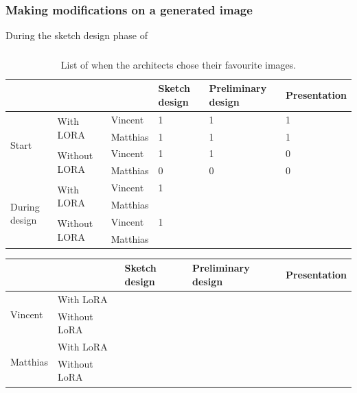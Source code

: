 \subsubsection{Making modifications on a generated image}
During the sketch design phase of 
\subsubsection{}
\begin{table}[h]
\centering
\begin{tabular}{|l|l|l|l|l|l|}

\hline
 & & & Sketch design & Preliminary design & Presentation \\
 \hline

\multirow{4}{*}{Start} & \multirow{2}{*}{With LORA} & Vincent & 1 & 1 & 1 \\ 

\cline{3-6}
& & Matthias & 1 & 1 & 1 \\

\cline{2-6}
& \multirow{2}{*}{Without LORA} & Vincent & 1 & 1 & 0 \\ 

\cline{3-6}
& & Matthias & 0 & 0 & 0\\ 

\hline
\hline

\multirow{4}{*}{During design} 
  & \multirow{2}{*}{With LORA} 
      & Vincent & 1 & & \\ \cline{3-6}
  &                                  
      & Matthias & & & \\ \cline{2-6}
  & \multirow{2}{*}{Without LORA} 
      & Vincent & 1 & & \\ \cline{3-6}
  &                                  
      & Matthias & & & \\ \hline
\end{tabular}
\caption{List of when the architects chose their favourite images.}
\label{tab:design-phases}
\end{table}

\begin{table}[h]
\centering
\begin{tabular}{|l|l|l|l|l|}

\hline
& & Sketch design & Preliminary design & Presentation \\
\hline

\multirow{2}{*}{Vincent} & With LoRA & & & \\
\cline{2-5}
& Without LoRA & & & \\
\hline
\multirow{2}{*}{Matthias} & With LoRA & & & \\
\cline{2-5}
& Without LoRA & & & \\
\hline
\end{tabular}
\end{table}